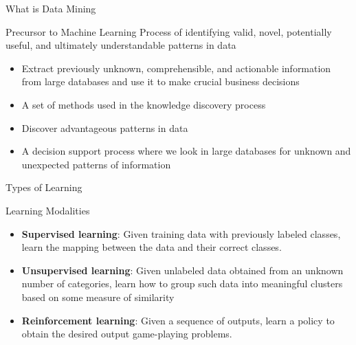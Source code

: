\documentclass[aspectratio=169,xcolor=dvipsnames,svgnames,x11names,fleqn]{beamer}
\begin{document}
\begin{frame}{What is Data Mining}
\begin{tblock}{Precursor to Machine Learning}
Process of identifying valid, novel, potentially useful, and ultimately understandable patterns in data
\begin{itemize}
    \item<2-> Extract previously unknown, comprehensible, and actionable information from large databases and use it to make crucial business decisions
    \item<3-> A set of methods used in the knowledge discovery process
    \item<4-> Discover advantageous patterns in data
    \item<5-> A decision support process where we look in large databases
for unknown and unexpected patterns of information
\end{itemize}
\end{tblock}
\end{frame}

\begin{frame}{Types of Learning}
\begin{tblock}{Learning Modalities}
    
\begin{itemize}
    \item<2-> {\bf\color{DarkBlue} Supervised learning}: Given training data with previously labeled classes, learn the mapping between the data and their correct classes. 
    \item<3-> {\bf\color{DarkBlue} Unsupervised learning}: Given unlabeled data obtained from an unknown number of categories, learn how to group such data into meaningful clusters based on some measure of similarity
    \item<4-> {\bf\color{DarkBlue} Reinforcement learning}: Given a sequence of outputs, learn a policy to obtain the desired output game-playing problems.
\end{itemize}
\end{tblock}

\end{frame}
\end{document}

